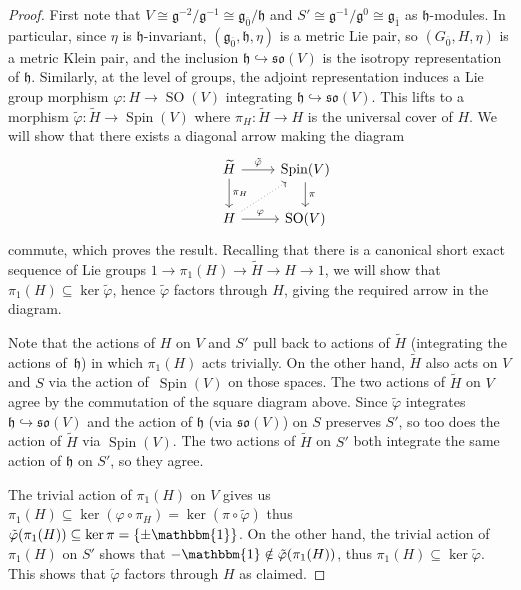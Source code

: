 \documentclass[pdftex]{sigma}
\numberwithin{equation}{section}
\newcommand{\fg}{\mathfrak{g}}
\newcommand{\fh}{\mathfrak{h}}
\newcommand{\fso}{\mathfrak{so}}
\newcommand{\Htilde}{\widetilde{H}}
\newcommand{\1}{\mathbbm{1}}
\DeclareMathOperator{\Spin}{Spin}
\DeclareMathOperator{\SO}{SO}
\begin{document}
\begin{proof}
	First note that $V\cong \fg^{-2}/\fg^{-1} \cong \fg_{\overline0}/\fh$ and $S'\cong\fg^{-1}/\fg^0\cong\fg_{\overline1}$ as $\fh$-modules. In particular, since $\eta$ is $\fh$-invariant, $(\fg_{\overline0},\fh,\eta)$ is a metric Lie pair, so $(G_{\overline0},H,\eta)$ is a metric Klein pair, and the inclusion $\fh\hookrightarrow\fso(V)$ is the isotropy representation of $\fh$. Similarly, at the level of groups, the adjoint representation induces a Lie group morphism $\varphi\colon H\to\SO(V)$ integrating $\fh\hookrightarrow\fso(V)$. This lifts to a morphism $\tilde\varphi\colon\Htilde \to \Spin(V)$ where $\pi_H\colon\Htilde\to H$ is the universal cover of $H$. We will show that there exists a diagonal arrow making the diagram
		\[
		\begin{tikzcd}
			& \Htilde \ar[d,"\pi_H"]\ar[r,"\tilde\varphi"]	& \Spin(V) \ar[d,"\pi"]	\\
			& H \ar[r,"\varphi"]\ar[ur,dotted]	& \SO(V)
		\end{tikzcd}
		\]
	commute, which proves the result. Recalling that there is a canonical short exact sequence of Lie groups
$ 1 \longrightarrow \pi_1(H) \longrightarrow\Htilde \longrightarrow H \longrightarrow1$,
	we will show that $\pi_1(H)\subseteq\ker\tilde\varphi$, hence $\tilde\varphi$ factors through $H$, giving the required arrow in the diagram.
	
	Note that the actions of $H$ on $V$ and $S'$ pull back to actions of $\Htilde$ (integrating the actions of~$\fh$) in which $\pi_1(H)$ acts trivially. On the other hand, $\Htilde$ also acts on $V$ and $S$ via the action of~$\Spin(V)$ on those spaces. The two actions of $\Htilde$ on $V$ agree by the commutation of the square diagram above. Since $\tilde\varphi$ integrates $\fh\hookrightarrow \fso(V)$ and the action of $\fh$ (via $\fso(V)$) on $S$ preserves $S'$, so too does the action of $\Htilde$ via $\Spin(V)$. The two actions of $\Htilde$ on $S'$ both integrate the same action of $\fh$ on $S'$, so they agree.
		
	The trivial action of $\pi_1(H)$ on $V$ gives us
$\pi_1(H)\subseteq\ker(\varphi\circ\pi_H)=\ker(\pi\circ\tilde\varphi)
$
	thus $\tilde\varphi(\pi_1(H))\subseteq\ker\pi=\{\pm\1\}$. On the other hand, the trivial action of $\pi_1(H)$ on $S'$ shows that $-\1\notin\tilde\varphi(\pi_1(H))$, thus $\pi_1(H)\subseteq\ker\tilde\varphi$. This shows that $\tilde\varphi$ factors through $H$ as claimed.
\end{proof}
\end{document}
